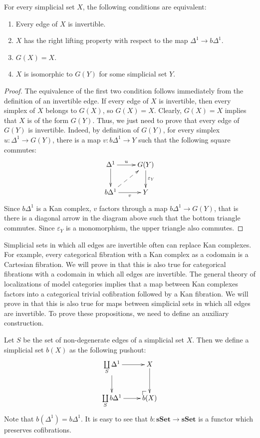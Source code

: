\documentclass[reqno]{amsart}
\makeatletter
\theoremstyle{definition}
\theoremstyle{remark}
\newcommand{\bDelta}{b \Delta}
\newcommand{\cat}[1]{\mathbf{#1}}
\newcommand{\sSet}{\cat{sSet}}
\numberwithin{figure}{section}
\newcommand{\po}[1][dr]{\save*!/#1+1.2pc/#1:(1,-1)@^{|-}\restore}
\makeatother
\begin{document}
\begin{lem}
For every simplicial set $X$, the following conditions are equivalent:
\begin{enumerate}
\item Every edge of $X$ is invertible.
\item $X$ has the right lifting property with respect to the map $\Delta^1 \to \bDelta^1$.
\item $G(X) = X$.
\item $X$ is isomorphic to $G(Y)$ for some simplicial set $Y$.
\end{enumerate}
\end{lem}
\begin{proof}
The equivalence of the first two condition follows immediately from the definition of an invertible edge.
If every edge of $X$ is invertible, then every simplex of $X$ belongs to $G(X)$, so $G(X) = X$.
Clearly, $G(X) = X$ implies that $X$ is of the form $G(Y)$.
Thus, we just need to prove that every edge of $G(Y)$ is invertible.
Indeed, by definition of $G(Y)$, for every simplex $u : \Delta^1 \to G(Y)$, there is a map $v : \bDelta^1 \to Y$ such that the following square commutes:
\[ \xymatrix{ \Delta^1 \ar[r]^-u \ar[d]         & G(Y) \ar[d]^{\varepsilon_Y} \\
              \bDelta^1 \ar[r]_-v \ar@{-->}[ur] & Y
            } \]
Since $\bDelta^1$ is a Kan complex, $v$ factors through a map $\bDelta^1 \to G(Y)$, that is there is a diagonal arrow in the diagram above such that the bottom triangle commutes.
Since $\varepsilon_Y$ is a monomorphism, the upper triangle also commutes.
\end{proof}

Simplicial sets in which all edges are invertible often can replace Kan complexes.
For example, every categorical fibration with a Kan complex as a codomain is a Cartesian fibration.
We will prove in  that this is also true for categorical fibrations with a codomain in which all edges are invertible.
The general theory of localizations of model categories implies that a map between Kan complexes factors into a categorical trivial cofibration followed by a Kan fibration.
We will prove in  that this is also true for maps between simplicial sets in which all edges are invertible.
To prove these propositions, we need to define an auxiliary construction.

Let $S$ be the set of non-degenerate edges of a simplicial set $X$.
Then we define a simplicial set $b(X)$ as the following pushout:
\[ \xymatrix{ \coprod\limits_S \Delta^1 \ar[r] \ar[d]  & X \ar[d] \\
              \coprod\limits_S \bDelta^1 \ar[r]        & \po b(X)
            } \]
Note that $b(\Delta^1) = \bDelta^1$.
It is easy to see that $b : \sSet \to \sSet$ is a functor which preserves cofibrations.
\end{document}
